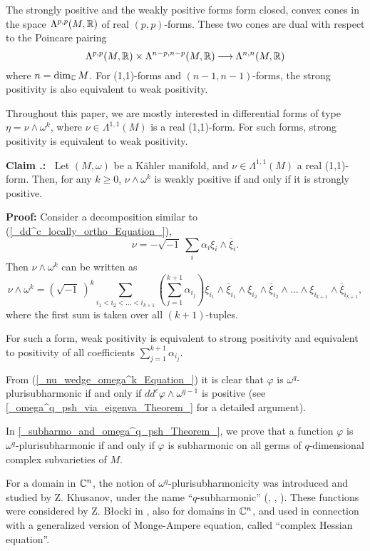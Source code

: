 \documentclass[11pt]{article}
\numberwithin{equation}{section}
\def\eqref#1{(\ref{#1})}
\newcommand{\arrow}{{\:\longrightarrow\:}}
\newcommand{\C}{{\Bbb C}}
\newcommand{\R}{{\Bbb R}}
\newcommand{\6}{\partial}
\def\1{\sqrt{-1}\:}
\renewcommand{\bar}{\overline}
\renewcommand{\phi}{\varphi}
\renewcommand{\geq}{\geqslant}
\newcounter{Mycounter}[section]
\newcounter{claim}[section]
\renewcommand{\theclaim}{{Claim \thesection.\arabic{claim}}}
\newcommand{\claim}{%
    \setcounter{claim}{\value{Mycounter}}
    \refstepcounter{claim}
    \stepcounter{Mycounter}
    {\noindent \bf \theclaim:\ }}
\def\blacksquare{\hbox{\vrule width 5pt height 5pt depth 0pt}}
\def\endproof{\blacksquare}
\begin{document}
The strongly positive and the weakly positive forms
form closed, convex cones in the space 
$\Lambda^{p,p}(M,\R)$ of real $(p,p)$-forms.
These two cones are dual with respect to the Poincare pairing
\[
\Lambda^{p,p}(M,\R) \times \Lambda^{n-p,n-p}(M,\R)\arrow \Lambda^{n,n}(M,\R)
\]
where $n=\dim_\C M$.
For (1,1)-forms and $(n-1,n-1)$-forms,
the strong positivity is also equivalent
to weak positivity.

Throughout this paper, we are mostly interested in 
differential forms of type $\eta = \nu \wedge \omega^k$,
where $\nu\in \Lambda^{1,1}(M)$ is a real (1,1)-form.
For such forms, strong positivity is equivalent
to weak positivity.

\hfill

\claim \label{_strong_posi_equi_weak_Claim_}
Let $(M, \omega)$ be a K\"ahler manifold, and 
$\nu\in \Lambda^{1,1}(M)$ a real (1,1)-form.
Then, for any $k\geq 0$, $\nu\wedge \omega^k$
is weakly positive if and only if it is strongly positive.

\hfill

{\bf Proof:} Consider a decomposition similar to 
\eqref{_dd^c_locally_ortho_Equation_},
\[\nu = -\1\sum_i \alpha_i \xi_i\wedge\bar\xi_i.
\]
Then $\nu\wedge \omega^k$ can be written as
\begin{equation}\label{_nu_wedge_omega^k_Equation_}
\nu\wedge \omega^k = (\1)^k \sum_{i_1< i_2 < ... <
  i_{k+1} } 
\left(\sum_{j=1}^{k+1} \alpha_{i_j}\right) 
\xi_{i_1}\wedge\bar\xi_{i_1}\wedge\xi_{i_2}\wedge\bar\xi_{i_2}
\wedge ...\wedge \xi_{i_{k+1}}\wedge\bar\xi_{i_{k+1}},
\end{equation}
where the first sum is taken over all $(k+1)$-tuples.

For such a form, weak positivity is equivalent to strong
positivity and equivalent to positivity of all
coefficients $\sum_{j=1}^{k+1} \alpha_{i_j}$. \endproof

\hfill

From \eqref{_nu_wedge_omega^k_Equation_}
it is clear that $\phi$ is $\omega^q$-plurisubharmonic
if and only if $dd^c\phi\wedge \omega^{q-1}$
is positive (see \ref{_omega^q_psh_via_eigenva_Theorem_}
for a detailed argument). 

In \ref{_subharmo_and_omega^q_psh_Theorem_},
we prove that a function $\phi$ is  $\omega^q$-plurisubharmonic
if and only if $\phi$ is subharmonic on all 
germs of $q$-dimensional complex subvarieties
of $M$.

For a domain in $\C^n$, the notion of 
$\omega^q$-plurisubharmonicity was introduced and studied
by Z. Khusanov, under the name ``$q$-subharmonic'' 
(\cite{_Khusanov_1_}, \cite{_Khusanov_2_},
\cite{_Khusanov_3_}). These functions were considered
by Z. B\l ocki in \cite{_Blocki_}, also for domains in
$\C^n$, and used in connection with a generalized
version of Monge-Ampere equation, called ``complex 
Hessian equation''.
\end{document}

